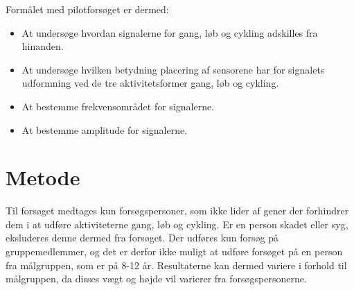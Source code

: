 Formålet med pilotforsøget er dermed:\vspace{-3mm}
\begin{itemize}
	\item At undersøge hvordan signalerne for gang, løb og cykling adskilles fra hinanden. 
	\item At undersøge hvilken betydning placering af sensorene har for signalets udformning ved de tre aktivitetsformer gang, løb og cykling. 
	\item At bestemme frekvensområdet for signalerne.
	\item At bestemme amplitude for signalerne.
\end{itemize}

\section{Metode}

Til forsøget medtages kun forsøgspersoner, som ikke lider af gener der forhindrer dem i at udføre aktiviteterne gang, løb og cykling. Er en person skadet eller syg, eksluderes denne dermed fra forsøget. Der udføres kun forsøg på gruppemedlemmer, og det er derfor ikke muligt at udføre forsøget på en person fra målgruppen, som er på 8-12 år. Resultaterne kan dermed variere i forhold til målgruppen, da disses vægt og højde vil varierer fra forsøgspersonerne. 

